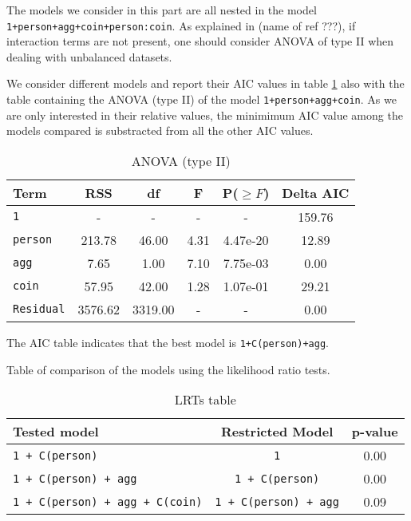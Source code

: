 \documentclass[a4paper, 12pt,oneside]{article}
\begin{document}
			The models we consider in this part are all nested in the model \texttt{1+person+agg+coin+person:coin}. As explained in (name of ref ???), if interaction terms are not present, one should consider ANOVA of type II when dealing with unbalanced datasets. 
			
			We consider different models and report their AIC values in table \ref{tab:WLS_AIC} also with the table containing the ANOVA (type II) of the model \texttt{1+person+agg+coin}. As we are only interested in their relative values, the minimimum AIC value among the models compared is substracted from all the other AIC values. 
			\begin{table}[htb]
				\centering
				\caption{ANOVA (type II)}
				\label{tab:WLS_AIC}
				\begin{tabular}{lccccc}
				\toprule
				Term & RSS & df & F & P($\ge F$) & Delta AIC \\
				\midrule
				\texttt{1} & - & - & - & - & 159.76  \\
				\texttt{person} & 213.78 & 46.00 & 4.31 & 4.47e-20 & 12.89 \\
				\texttt{agg} & 7.65 & 1.00 & 7.10 & 7.75e-03 & 0.00 \\
				\texttt{coin} & 57.95 & 42.00 & 1.28 & 1.07e-01 & 29.21 \\
				\texttt{Residual} & 3576.62 & 3319.00 & - & - & 0.00 \\
				\bottomrule
				\end{tabular}
			\end{table}

			The AIC table indicates that the best model is \texttt{1+C(person)+agg}. 

			Table of comparison of the models using the likelihood ratio tests. 

			\begin{table}[htb]
				\centering
				\caption{LRTs table}
				\label{tab:WLS_LRT}
				\begin{tabular}{lcc}
				\toprule
				Tested model & Restricted Model & p-value \\
				\midrule
				\texttt{1 + C(person)} & \texttt{1} & 0.00 \\
				\texttt{1 + C(person) + agg} & \texttt{1 + C(person)} & 0.00 \\
				\texttt{1 + C(person) + agg + C(coin)} & \texttt{1 + C(person) + agg} & 0.09 \\
				\bottomrule
				\end{tabular}
				\end{table}
\end{document}
